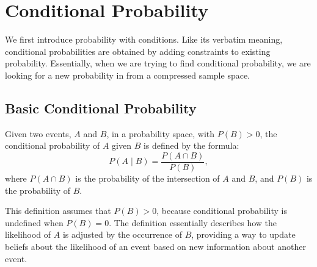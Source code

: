\section{Conditional Probability}
We first introduce probability with conditions. Like its verbatim meaning, conditional probabilities are obtained by adding constraints to existing probability. Essentially, when we 
are trying to find conditional probability, we are looking for a new probability in from a compressed sample space.

\subsection{Basic Conditional Probability}
\begin{definition}\label{def:condprob}
    Given two events, \(A\) and \(B\), in a probability space, with \(P(B) > 0\), the conditional probability of \(A\) given \(B\) is defined by the formula:
    \[
    P(A \mid B) = \frac{P(A \cap B)}{P(B)},
    \]
    where \(P(A \cap B)\) is the probability of the intersection of \(A\) and \(B\), and \(P(B)\) is the probability of \(B\).
    \end{definition}
\begin{remark}
    This definition assumes that \(P(B) > 0\), because conditional probability is undefined when \(P(B) = 0\). The definition essentially describes how the likelihood of \(A\) is adjusted by the occurrence of \(B\), providing a way to update beliefs about the likelihood of an event based on new information about another event.
\end{remark}

